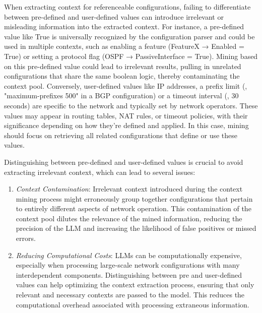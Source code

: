 When extracting context for referenceable configurations,
failing to differentiate between pre-defined and user-defined values can introduce irrelevant or misleading information into the extracted context.
For instance, a pre-defined value like True is universally recognized by the configuration parser and could be used in multiple contexts, such as enabling a feature (FeatureX → Enabled = True) or setting a protocol flag (OSPF → PassiveInterface = True). Mining based on this pre-defined value could lead to irrelevant results, pulling in unrelated configurations that share the same boolean logic, thereby contaminating the context pool.
Conversely, user-defined values like IP addresses, a prefix limit (\eg, "maximum-prefixes 500" in a BGP configuration) or a timeout interval (\eg, 30 seconds) are specific to the network and typically set by network operators. These values may appear in routing tables, NAT rules, or timeout policies, with their significance depending on how they’re defined and applied.  In this case, mining should focus on retrieving all related configurations that define or use these values. 

Distinguishing between pre-defined and user-defined values is crucial to avoid extracting irrelevant context, which can lead to several issues:

\begin{enumerate}
    \item \textit{Context Contamination}: 
    Irrelevant context introduced during the context mining process might erroneously group together configurations that pertain to entirely different aspects of network operation.
    This contamination of the context pool dilutes the relevance of the mined information, reducing the precision of the LLM and increasing the likelihood of false positives or missed errors. 
    \item \textit{Reducing Computational Costs}: LLMs can be computationally expensive, especially when processing large-scale network configurations with many interdependent components. Distinguishing between pre and user-defined values can help optimizing the context extraction process, ensuring that only relevant and necessary contexts are passed to the model. This reduces the computational overhead associated with processing extraneous information.

\end{enumerate}

